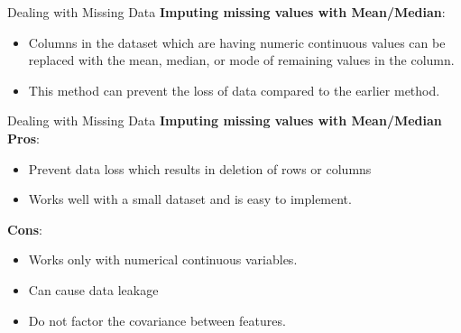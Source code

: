 \documentclass[11pt]{beamer}
\begin{document}
\begin{frame}{Dealing with Missing Data}
\textbf{Imputing missing values with Mean/Median}:
\begin{itemize}
\item Columns in the dataset which are having numeric continuous values can be replaced with the mean, median, or mode of remaining values in the column. 
\item This method can prevent the loss of data compared to the earlier method. 
\end{itemize}
\end{frame}
\begin{frame}{Dealing with Missing Data}
\textbf{Imputing missing values with Mean/Median}\\
\vspace{0.5cm}
\textbf{Pros}:
\begin{itemize}
\item Prevent data loss which results in deletion of rows or columns
\item Works well with a small dataset and is easy to implement.
\end{itemize}
\textbf{Cons}:
\begin{itemize}
\item Works only with numerical continuous variables.
\item Can cause data leakage
\item Do not factor the covariance between features.
\end{itemize}
\end{frame}
\end{document}
